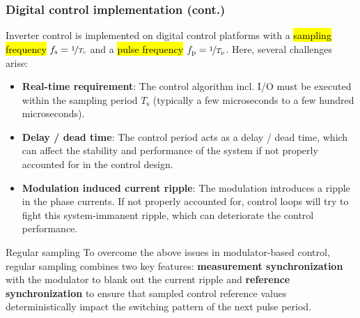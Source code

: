 \begin{frame}
    \frametitle{Digital control implementation (cont.)}
    Inverter control is implemented on digital control platforms with a \hl{sampling frequency} $f_\mathrm{s}=\nicefrac{1}{T_\mathrm{s}}$ and a \hl{pulse frequency} $f_\mathrm{p}=\nicefrac{1}{T_\mathrm{p}}$. \pause Here, several challenges arise:
    \begin{itemize}
        \item \textbf{Real-time requirement}: The control algorithm incl. I/O must be executed within the sampling period $T_\mathrm{s}$ (typically a few microseconds to a few hundred microseconds). \pause
        \item \textbf{Delay / dead time}: The control period acts as a delay / dead time, which can affect the stability and performance of the system if not properly accounted for in the control design. \pause
        \item \textbf{Modulation induced current ripple}: The modulation introduces a ripple in the phase currents. If not properly accounted for, control loops will try to fight this system-immanent ripple, which can deteriorate the control performance.
    \end{itemize}\pause
    \vspace{-0.2cm}
    \begin{varblock}{Regular sampling}
        To overcome the above issues in modulator-based control, regular sampling combines two key features:  \textbf{measurement synchronization} with the modulator to blank out the current ripple and \textbf{reference synchronization} to ensure that sampled control reference values deterministically impact the switching pattern of the next pulse period.
    \end{varblock}
\end{frame}

